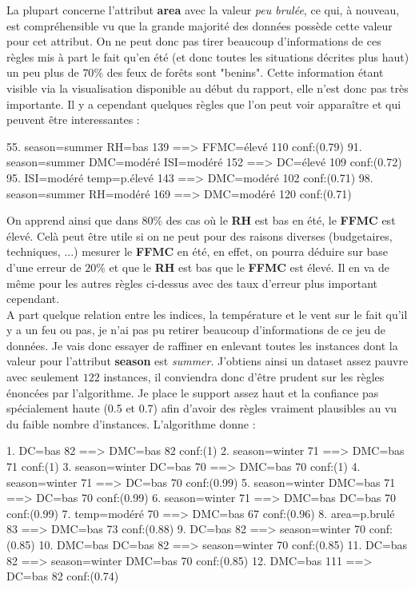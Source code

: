 \documentclass{article}
\begin{document}
\begin{sffamily}
La plupart concerne l'attribut \textbf{area} avec la valeur \textit{peu brulée}, ce qui, à nouveau, est compréhensible vu que la grande majorité des 
données possède cette valeur pour cet attribut. On ne peut donc pas tirer beaucoup d'informations de ces règles mis à part le fait qu'en été (et donc 
toutes les situations décrites plus haut) un peu plus de $70\%$ des feux de forêts sont "benins". Cette information étant visible via la 
visualisation disponible au début du rapport, elle n'est donc pas très importante. Il y a cependant quelques règles que l'on peut voir apparaître et 
qui peuvent être interessantes :
\begin{center}
	\begin{boxedverbatim}
 55. season=summer RH=bas 139 ==> FFMC=élevé 110    conf:(0.79)
 91. season=summer DMC=modéré ISI=modéré 152 ==> DC=élevé 109    conf:(0.72)
 95. ISI=modéré temp=p.élevé 143 ==> DMC=modéré 102    conf:(0.71)
 98. season=summer RH=modéré 169 ==> DMC=modéré 120    conf:(0.71)
	\end{boxedverbatim}
\end{center}

On apprend ainsi que dans $80\%$ des cas où le \textbf{RH} est bas en été, le \textbf{FFMC} est élevé. Celà peut être utile si on ne peut pour des 
raisons diverses (budgetaires, techniques, ...) mesurer le \textbf{FFMC} en été, en effet, on pourra déduire sur base d'une erreur de $20\%$ et que 
le \textbf{RH} est bas que le \textbf{FFMC} est élevé. Il en va de même pour les autres règles ci-dessus avec des taux d'erreur plus important 
cependant. \\

A part quelque relation entre les indices, la température et le vent sur le fait qu'il y a un feu ou pas, je n'ai pas pu retirer beaucoup 
d'informations de ce jeu de données. Je vais donc essayer de raffiner en enlevant toutes les instances dont la valeur pour l'attribut \textbf{season}
est \textit{summer}. J'obtiens ainsi un dataset assez pauvre avec seulement $122$ instances, il conviendra donc d'être prudent sur les règles 
énoncées par l'algorithme. Je place le support assez haut et la confiance pas spécialement haute (0.5 et 0.7) afin d'avoir des règles vraiment 
plausibles au vu du faible nombre d'instances. L'algorithme donne :

\begin{center}
	\begin{boxedverbatim}
  1. DC=bas 82 ==> DMC=bas 82    conf:(1)
  2. season=winter 71 ==> DMC=bas 71    conf:(1)
  3. season=winter DC=bas 70 ==> DMC=bas 70    conf:(1)
  4. season=winter 71 ==> DC=bas 70    conf:(0.99)
  5. season=winter DMC=bas 71 ==> DC=bas 70    conf:(0.99)
  6. season=winter 71 ==> DMC=bas DC=bas 70    conf:(0.99)
  7. temp=modéré 70 ==> DMC=bas 67    conf:(0.96)
  8. area=p.brulé 83 ==> DMC=bas 73    conf:(0.88)
  9. DC=bas 82 ==> season=winter 70    conf:(0.85)
 10. DMC=bas DC=bas 82 ==> season=winter 70    conf:(0.85)
 11. DC=bas 82 ==> season=winter DMC=bas 70    conf:(0.85)
 12. DMC=bas 111 ==> DC=bas 82    conf:(0.74)
	\end{boxedverbatim}
\end{center}


\end{sffamily}
\end{document}
